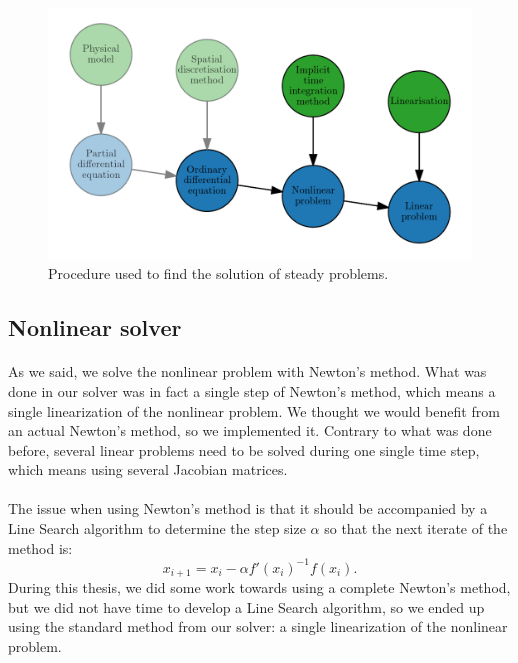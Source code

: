       \begin{figure}
        \centering
        \includegraphics{figures/steady_solve.png}
        \caption{Procedure used to find the solution of steady problems.}
        \label{fig:steady_solve}
      \end{figure}


    \subsection{Nonlinear solver}

      \paragraph{}
      As we said, we solve the nonlinear problem with Newton's method.
      What was done in our solver was in fact a single step of Newton's method, which means a single linearization of the nonlinear problem.
      We thought we would benefit from an actual Newton's method, so we implemented it.
      Contrary to what was done before, several linear problems need to be solved during one single time step, which means using several Jacobian matrices.

      \paragraph{}
      The issue when using Newton's method is that it should be accompanied by a Line Search algorithm to determine the step size $\alpha$ so that the next iterate of the method is:
      \begin{equation}
        x_{i+1} = x_i - \alpha f'\left(x_i\right)^{-1} f\left(x_i\right) .
      \end{equation}
      During this thesis, we did some work towards using a complete Newton's method, but we did not have time to develop a Line Search algorithm, so we ended up using the standard method from our solver: a single linearization of the nonlinear problem.


